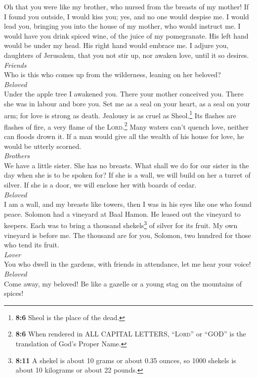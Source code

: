  Oh that you were like my brother, who nursed from the
breasts of my mother! If I found you outside, I would kiss you; yes, and
no one would despise me.  I would lead you, bringing you
into the house of my mother, who would instruct me. I would have you
drink spiced wine, of the juice of my pomegranate.  His
left hand would be under my head. His right hand would embrace me.
 I adjure you, daughters of Jerusalem, that you not stir
up, nor awaken love, until it so desires.\\
\emph{Friends}\\
 Who is this who comes up from the wilderness, leaning on
her beloved?\\
\emph{Beloved}\\
Under the apple tree I awakened you. There your mother conceived you.
There she was in labour and bore you.  Set me as a seal on
your heart, as a seal on your arm; for love is strong as death. Jealousy
is as cruel as Sheol.\footnote{\textbf{8:6} Sheol is the place of the
  dead.} Its flashes are flashes of fire, a very flame of the
\textsc{Lord}.\footnote{\textbf{8:6} When rendered in ALL CAPITAL
  LETTERS, ``\textsc{Lord}'' or ``GOD'' is the translation of God's
  Proper Name.}  Many waters can't quench love, neither
can floods drown it. If a man would give all the wealth of his house for
love, he would be utterly scorned.\\
\emph{Brothers}\\
 We have a little sister. She has no breasts. What shall
we do for our sister in the day when she is to be spoken for?
 If she is a wall, we will build on her a turret of
silver. If she is a door, we will enclose her with boards of cedar.\\
\emph{Beloved}\\
 I am a wall, and my breasts like towers, then I was in
his eyes like one who found peace.  Solomon had a
vineyard at Baal Hamon. He leased out the vineyard to keepers. Each was
to bring a thousand shekels\footnote{\textbf{8:11} A shekel is about 10
  grams or about 0.35 ounces, so 1000 shekels is about 10 kilograms or
  about 22 pounds.} of silver for its fruit.  My own
vineyard is before me. The thousand are for you, Solomon, two hundred
for those who tend its fruit.\\
\emph{Lover}\\
 You who dwell in the gardens, with friends in
attendance, let me hear your voice!\\
\emph{Beloved}\\
 Come away, my beloved! Be like a gazelle or a young stag
on the mountains of spices!
